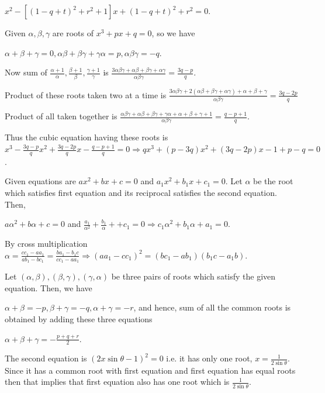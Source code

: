   $x^2 - [(1 - q + t)^2 + r^2 + 1]x + (1 - q + t)^2 + r^2 = 0$.
\item Given $\alpha, \beta, \gamma$ are roots of $x^3 + px + q = 0$, so we have

  $\alpha + \beta + \gamma = 0, \alpha\beta + \beta\gamma + \gamma\alpha = p, \alpha\beta\gamma = -q$.

  Now sum of $\frac{\alpha + 1}{\alpha}, \frac{\beta + 1}{\beta}, \frac{\gamma + 1}{\gamma}$ is
  $\frac{3\alpha\beta\gamma + \alpha\beta + \beta\gamma + \alpha\gamma}{\alpha\beta\gamma} = \frac{3q -
    p}{q}$.

  Product of these roots taken two at a time is $\frac{3\alpha\beta\gamma + 2(\alpha\beta + \beta\gamma +
    \alpha\gamma) + \alpha + \beta + \gamma}{\alpha\beta\gamma} = \frac{3q - 2p}{q}$

  Product of all taken together is $\frac{\alpha\beta\gamma + \alpha\beta + \beta\gamma + \gamma\alpha +
    \alpha + \beta + \gamma + 1}{\alpha\beta\gamma} = \frac{q - p + 1}{q}$.

  Thus the cubic equation having these roots is $x^3 - \frac{3q - p}{q}x^2 + \frac{3q - 2p}{q}x - \frac{q -
    p + 1}{q} = 0 \Rightarrow qx^3 + (p - 3q)x^2 + (3q - 2p)x - 1 + p - q = 0$.
\item Given equations are $ax^2 + bx + c = 0$ and $a_1x^2 + b_1x + c_1 = 0$. Let $\alpha$ be the root which
  satisfies first equation and its reciprocal satisfies the second equation. Then,

  $a\alpha^2 + b\alpha + c = 0$ and $\frac{a_1}{\alpha^2} + \frac{b_1}{\alpha} ++ c_1 = 0 \Rightarrow
  c_1\alpha^2 + b_1\alpha + a_1 = 0$.

  By cross multiplication $\alpha = \frac{cc_1 - aa_1}{ab_1 - bc_1} = \frac{ba_1 - b_1c}{cc_1 - aa_1}
  \Rightarrow (aa_1 - cc_1)^2 = (bc_1 - ab_1)(b_1c - a_1b)$.
\item Let $(\alpha, \beta), (\beta, \gamma), (\gamma, \alpha)$ be three pairs of roots which satisfy the
  given equation. Then, we have

  $\alpha + \beta = -p, \beta + \gamma = -q, \alpha + \gamma = -r$, and hence, sum of all the common roots is
  obtained by adding these three equations

  $\alpha + \beta + \gamma = -\frac{p + q + r}{2}$.
\item The second equation is $(2x\sin\theta - 1)^2 = 0$ i.e. it has only one root, $x =
  \frac{1}{2\sin\theta}$. Since it has a common root with first equation and first equation has equal roots
  then that implies that first equation also has one root which is $\frac{1}{2\sin\theta}$.

